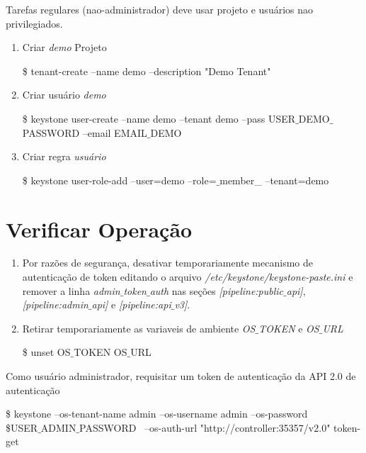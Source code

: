 Tarefas regulares (nao-administrador) deve usar projeto e usuários nao privilegiados.

\begin{enumerate}
	\item Criar \emph{demo} Projeto
	\begin{snugshade}
		\$	tenant-create --name demo --description "Demo Tenant"
	\end{snugshade}				
	
	\item Criar usuário \emph{demo}
	\begin{snugshade}
		\$		keystone user-create --name demo --tenant demo --pass USER$\_$DEMO$\_$PASSWORD --email EMAIL$\_$DEMO
	\end{snugshade}					
	
	\item Criar regra \emph{usuário} 
	\begin{snugshade}
		\$	 keystone user-role-add --user=demo --role=$\_$member\_ --tenant=demo
	\end{snugshade}					

\end{enumerate}

	
	\section{Verificar Operação}
	\begin{enumerate}
		\item Por razões de segurança, desativar temporariamente mecanismo de autenticação de token editando o arquivo \emph{/etc/keystone/keystone-paste.ini} e remover a linha \emph{admin$\_$token$\_$auth} nas seções \emph{[pipeline:public$\_$api]}, \emph{[pipeline:admin$\_$api]} e \emph{[pipeline:api$\_$v3]}.	
		
		\item Retirar temporariamente as variaveis de ambiente \emph{OS$\_$TOKEN} e \emph{OS$\_$URL}
		\begin{snugshade}
			\$ unset OS$\_$TOKEN OS$\_$URL
		\end{snugshade}
	\end{enumerate}
	
		\item Como usuário administrador, requisitar um token de autenticação da API 2.0 de autenticação
		\begin{snugshade}
			\$ keystone --os-tenant-name admin --os-username admin --os-password\\ \$USER$\_$ADMIN$\_$PASSWORD \
		--os-auth-url "http://controller:35357/v2.0" token-get
		\end{snugshade}		
		
